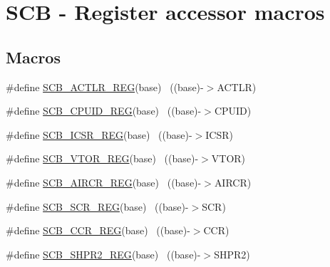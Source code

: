 \hypertarget{group___s_c_b___register___accessor___macros}{}\section{S\+CB -\/ Register accessor macros}
\label{group___s_c_b___register___accessor___macros}
\subsection*{Macros}
\begin{DoxyCompactItemize}
\item 
\#define \hyperlink{group___s_c_b___register___accessor___macros_gacc7b0065f69b9a0d772af30505d9d5e8}{S\+C\+B\+\_\+\+A\+C\+T\+L\+R\+\_\+\+R\+EG}(base)                                        ~((base)-\/$>$A\+C\+T\+LR)
\item 
\#define \hyperlink{group___s_c_b___register___accessor___macros_ga0fafcf57528f45b4ef5f3c5bfa627d55}{S\+C\+B\+\_\+\+C\+P\+U\+I\+D\+\_\+\+R\+EG}(base)                                        ~((base)-\/$>$C\+P\+U\+ID)
\item 
\#define \hyperlink{group___s_c_b___register___accessor___macros_ga32d507fb0a9ba80ad95e451fc93c942a}{S\+C\+B\+\_\+\+I\+C\+S\+R\+\_\+\+R\+EG}(base)                                          ~((base)-\/$>$I\+C\+SR)
\item 
\#define \hyperlink{group___s_c_b___register___accessor___macros_ga882585be47587da934194ffd169da43f}{S\+C\+B\+\_\+\+V\+T\+O\+R\+\_\+\+R\+EG}(base)                                          ~((base)-\/$>$V\+T\+OR)
\item 
\#define \hyperlink{group___s_c_b___register___accessor___macros_ga0510b76b89d5729f2ba9341356553f3e}{S\+C\+B\+\_\+\+A\+I\+R\+C\+R\+\_\+\+R\+EG}(base)                                        ~((base)-\/$>$A\+I\+R\+CR)
\item 
\#define \hyperlink{group___s_c_b___register___accessor___macros_ga6cd310502ec11012af2420c92138fb04}{S\+C\+B\+\_\+\+S\+C\+R\+\_\+\+R\+EG}(base)                                            ~((base)-\/$>$S\+CR)
\item 
\#define \hyperlink{group___s_c_b___register___accessor___macros_gae2955c3c122b0cd8454d0015bcac2780}{S\+C\+B\+\_\+\+C\+C\+R\+\_\+\+R\+EG}(base)                                            ~((base)-\/$>$C\+CR)
\item 
\#define \hyperlink{group___s_c_b___register___accessor___macros_gaeb160566ffdd3572f046e69f3b79e3e8}{S\+C\+B\+\_\+\+S\+H\+P\+R2\+\_\+\+R\+EG}(base)                                        ~((base)-\/$>$S\+H\+P\+R2)

\end{DoxyCompactItemize}
